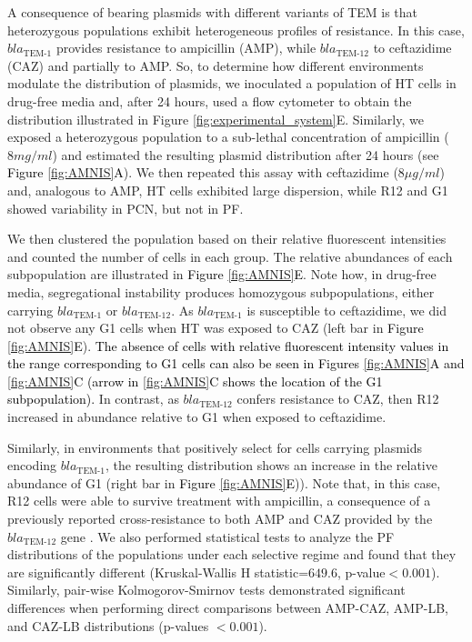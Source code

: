 \documentclass[fleqn,12pt]{wlscirep}
\newcommand{\blue}[1]{\textcolor{black}{#1}}
\newcommand{\fig}[1]{\textcolor{black}{#1}}
\begin{document}
A consequence of bearing plasmids with different variants of TEM is that heterozygous populations exhibit heterogeneous profiles of resistance.  In this case, $bla_{\text{TEM-1}}$ provides resistance to ampicillin (AMP), while $bla_{\text{TEM-12}}$ to ceftazidime (CAZ) and partially to AMP\cite{Rodriguez2018, mroczkowska2008fitness}. 
So, to determine how different environments modulate the distribution of plasmids, we inoculated a population of HT cells in drug-free media and, after 24 hours, used a flow cytometer to obtain the distribution illustrated in Figure \ref{fig:experimental_system}E.
Similarly, we exposed a heterozygous population to a sub-lethal concentration of ampicillin ($8 mg/ml$) and estimated the resulting plasmid distribution after 24 hours (see \fig{Figure \ref{fig:AMNIS}A}). We then repeated this assay with ceftazidime ($8 \mu g/ml$) and, analogous to AMP,  HT cells exhibited large dispersion, while R12 and G1 showed variability in PCN, but not in PF. 

We then clustered the population based on their relative fluorescent intensities and counted the number of cells in each group. The relative abundances of each subpopulation are illustrated in \fig{Figure \ref{fig:AMNIS}E}. Note how, in drug-free media, segregational instability produces homozygous subpopulations, either carrying $bla_{\text{TEM-1}}$ or $bla_{\text{TEM-12}}$.
As $bla_{\text{TEM-1}}$ is susceptible to ceftazidime, we did not observe any G1 cells when HT was exposed to CAZ (left bar in \fig{Figure \ref{fig:AMNIS}E}). \blue{ The absence of cells with relative fluorescent intensity values in the range corresponding to G1 cells can also be seen in  \fig{Figures \ref{fig:AMNIS}A} and \fig{\ref{fig:AMNIS}C} (arrow in \fig{\ref{fig:AMNIS}C} shows the location of the G1 subpopulation).} In contrast, as  $bla_{\text{TEM-12}}$ confers resistance to CAZ, then R12 increased in abundance relative to G1 when exposed to ceftazidime.

Similarly, in environments that positively select for cells carrying plasmids encoding $bla_{\text{TEM-1}}$, the resulting distribution shows an increase in the relative abundance of G1 (right bar in \fig{Figure \ref{fig:AMNIS}E})).
Note that, in this case, R12 cells were able to survive treatment with ampicillin, a consequence of a previously reported cross-resistance to both AMP and CAZ provided by the $bla_{\text{TEM-12}}$ gene \cite{Rodriguez2018,salverda2010natural}.
We also performed statistical tests to analyze the PF distributions of the populations under each selective regime and found that they are significantly different (Kruskal-Wallis H statistic=$649.6$, p-value$<0.001$). Similarly, pair-wise Kolmogorov-Smirnov tests demonstrated significant differences when performing direct comparisons between AMP-CAZ, AMP-LB, and CAZ-LB distributions (p-values $<0.001$).
  
\end{document}
